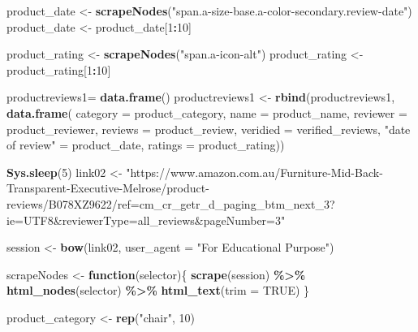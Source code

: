 \documentclass[
]{article}
\newenvironment{Shaded}{\begin{snugshade}}{\end{snugshade}}
\newcommand{\AttributeTok}[1]{\textcolor[rgb]{0.13,0.29,0.53}{#1}}
\newcommand{\ConstantTok}[1]{\textcolor[rgb]{0.56,0.35,0.01}{#1}}
\newcommand{\ControlFlowTok}[1]{\textcolor[rgb]{0.13,0.29,0.53}{\textbf{#1}}}
\newcommand{\DecValTok}[1]{\textcolor[rgb]{0.00,0.00,0.81}{#1}}
\newcommand{\FunctionTok}[1]{\textcolor[rgb]{0.13,0.29,0.53}{\textbf{#1}}}
\newcommand{\NormalTok}[1]{#1}
\newcommand{\OtherTok}[1]{\textcolor[rgb]{0.56,0.35,0.01}{#1}}
\newcommand{\SpecialCharTok}[1]{\textcolor[rgb]{0.81,0.36,0.00}{\textbf{#1}}}
\newcommand{\StringTok}[1]{\textcolor[rgb]{0.31,0.60,0.02}{#1}}
\begin{document}
\begin{Shaded}
\begin{Highlighting}[]
\NormalTok{  product\_date }\OtherTok{\textless{}{-}} \FunctionTok{scrapeNodes}\NormalTok{(}\StringTok{"span.a{-}size{-}base.a{-}color{-}secondary.review{-}date"}\NormalTok{)}
\NormalTok{  product\_date }\OtherTok{\textless{}{-}}\NormalTok{ product\_date[}\DecValTok{1}\SpecialCharTok{:}\DecValTok{10}\NormalTok{]}
  
\NormalTok{  product\_rating }\OtherTok{\textless{}{-}} \FunctionTok{scrapeNodes}\NormalTok{(}\StringTok{"span.a{-}icon{-}alt"}\NormalTok{)}
\NormalTok{  product\_rating }\OtherTok{\textless{}{-}}\NormalTok{ product\_rating[}\DecValTok{1}\SpecialCharTok{:}\DecValTok{10}\NormalTok{]}
  
\NormalTok{  productreviews1}\OtherTok{=} \FunctionTok{data.frame}\NormalTok{()}
\NormalTok{  productreviews1 }\OtherTok{\textless{}{-}} \FunctionTok{rbind}\NormalTok{(productreviews1, }\FunctionTok{data.frame}\NormalTok{(}
                      \AttributeTok{category =}\NormalTok{ product\_category,}
                      \AttributeTok{name =}\NormalTok{ product\_name,}
                      \AttributeTok{reviewer =}\NormalTok{ product\_reviewer,}
                      \AttributeTok{reviews =}\NormalTok{ product\_review,}
                      \AttributeTok{veridied =}\NormalTok{ verified\_reviews,}
                      \StringTok{"date of review"} \OtherTok{=}\NormalTok{ product\_date,}
                      \AttributeTok{ratings =}\NormalTok{ product\_rating))}

  
 \FunctionTok{Sys.sleep}\NormalTok{(}\DecValTok{5}\NormalTok{)}
\NormalTok{link02 }\OtherTok{\textless{}{-}} \StringTok{"https://www.amazon.com.au/Furniture{-}Mid{-}Back{-}Transparent{-}Executive{-}Melrose/product{-}reviews/B078XZ9622/ref=cm\_cr\_getr\_d\_paging\_btm\_next\_3?ie=UTF8\&reviewerType=all\_reviews\&pageNumber=3"}


\NormalTok{  session }\OtherTok{\textless{}{-}} \FunctionTok{bow}\NormalTok{(link02,}
               \AttributeTok{user\_agent =} \StringTok{"For Educational Purpose"}\NormalTok{)}

\NormalTok{  scrapeNodes }\OtherTok{\textless{}{-}} \ControlFlowTok{function}\NormalTok{(selector)\{}
    \FunctionTok{scrape}\NormalTok{(session) }\SpecialCharTok{\%\textgreater{}\%}
      \FunctionTok{html\_nodes}\NormalTok{(selector) }\SpecialCharTok{\%\textgreater{}\%}
      \FunctionTok{html\_text}\NormalTok{(}\AttributeTok{trim =} \ConstantTok{TRUE}\NormalTok{)}
\NormalTok{  \}}

\NormalTok{  product\_category }\OtherTok{\textless{}{-}} \FunctionTok{rep}\NormalTok{(}\StringTok{"chair"}\NormalTok{, }\DecValTok{10}\NormalTok{)}


\end{Highlighting}
\end{Shaded}
\end{document}
